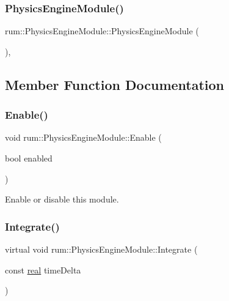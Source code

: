 \subsubsection{\texorpdfstring{Physics\+Engine\+Module()}{PhysicsEngineModule()}}
{\footnotesize\ttfamily rum\+::\+Physics\+Engine\+Module\+::\+Physics\+Engine\+Module (\begin{DoxyParamCaption}{ }\end{DoxyParamCaption})\hspace{0.3cm}{\ttfamily [explicit]}, {\ttfamily [protected]}}



\subsection{Member Function Documentation}
\mbox{\label{classrum_1_1_physics_engine_module_a5570ab64f9ff8e6449cbdbc32c9c36c9}} 
\subsubsection{\texorpdfstring{Enable()}{Enable()}}
{\footnotesize\ttfamily void rum\+::\+Physics\+Engine\+Module\+::\+Enable (\begin{DoxyParamCaption}\item[{bool}]{enabled }\end{DoxyParamCaption})}

Enable or disable this module. \mbox{\label{classrum_1_1_physics_engine_module_a8635a9194b86cf3c70723ebb4e8c967c}} 
\subsubsection{\texorpdfstring{Integrate()}{Integrate()}}
{\footnotesize\ttfamily virtual void rum\+::\+Physics\+Engine\+Module\+::\+Integrate (\begin{DoxyParamCaption}\item[{const \hyperlink{namespacerum_a7e8cca23573d5eaead0f138cbaa4862c}{real}}]{time\+Delta }\end{DoxyParamCaption})\hspace{0.3cm}{\ttfamily [pure virtual]}}

